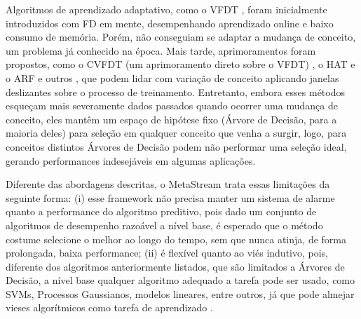 Algoritmos de aprendizado adaptativo, como o VFDT \cite{domingos2000mining},
foram inicialmente introduzidos com FD em mente, desempenhando aprendizado online e baixo consumo de memória. Porém, não conseguiam se adaptar a mudança de conceito, um problema já conhecido na época.
Mais tarde, aprimoramentos foram propostos, como o CVFDT (um aprimoramento direto sobre o VFDT) \cite{hulten2001mining}, o HAT \cite{bifet2009adaptive} e o ARF \cite{gomes2017adaptive} e outros \cite{manapragada2018extremely,bifet2017extremely}, que podem lidar com variação de conceito aplicando janelas deslizantes sobre o processo de treinamento.
Entretanto, embora esses métodos esqueçam mais severamente dados passados quando ocorrer uma mudança de conceito, eles mantêm um espaço de hipótese fixo (Árvore de Decisão, para a maioria deles) para seleção em qualquer conceito que venha a surgir, logo, para conceitos distintos Árvores de Decisão podem não performar uma seleção ideal, gerando performances indesejáveis em algumas aplicações.

Diferente das abordagens descritas, o MetaStream trata essas limitações da seguinte forma: (i) esse framework não precisa manter um sistema de alarme quanto a performance do algoritmo preditivo, pois dado um conjunto de algoritmos de desempenho razoável a nível base, é esperado que o método costume selecione o melhor ao longo do tempo, sem que nunca atinja, de forma prolongada, baixa performance; (ii) é flexível quanto ao viés indutivo, pois, diferente dos algoritmos anteriormente listados, que são limitados a Árvores de Decisão, a nível base qualquer algoritmo adequado a tarefa pode ser usado, como SVMs, Processos Gaussianos, modelos lineares, entre outros, já que pode almejar vieses algorítmicos como tarefa de aprendizado \cite{rossi2014metastream}.

